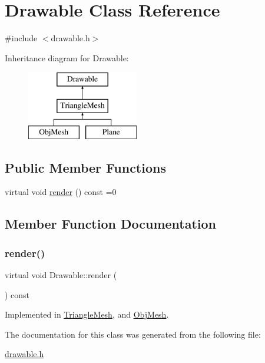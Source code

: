 \hypertarget{class_drawable}{}\section{Drawable Class Reference}
\label{class_drawable}


{\ttfamily \#include $<$drawable.\+h$>$}

Inheritance diagram for Drawable\+:\begin{figure}[H]
\begin{center}
\leavevmode
\includegraphics[height=3.000000cm]{class_drawable}
\end{center}
\end{figure}
\subsection*{Public Member Functions}
\begin{DoxyCompactItemize}
\item 
virtual void \mbox{\hyperlink{class_drawable_a773dfc1e1dc02e4156204af3939d04d1}{render}} () const =0
\end{DoxyCompactItemize}


\subsection{Member Function Documentation}
\mbox{\label{class_drawable_a773dfc1e1dc02e4156204af3939d04d1}} 
\subsubsection{\texorpdfstring{render()}{render()}}
{\footnotesize\ttfamily virtual void Drawable\+::render (\begin{DoxyParamCaption}{ }\end{DoxyParamCaption}) const\hspace{0.3cm}{\ttfamily [pure virtual]}}



Implemented in \mbox{\hyperlink{class_triangle_mesh_acd43f84016ec88e288df4c0f6739fc70}{Triangle\+Mesh}}, and \mbox{\hyperlink{class_obj_mesh_a735d4c7978094b8ba07cd720e496ea60}{Obj\+Mesh}}.



The documentation for this class was generated from the following file\+:\begin{DoxyCompactItemize}
\item 
\mbox{\hyperlink{drawable_8h}{drawable.\+h}}\end{DoxyCompactItemize}

